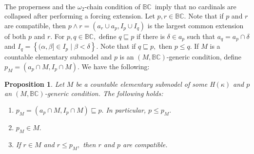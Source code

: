 \documentclass{article}
\newtheorem{proposition}[theorem]{Proposition}
\begin{document}
\qquad\qquad\ \ \ 

The properness and the $\omega_{2}$-chain condition of $\mathbb{BC}$\ imply
that no cardinals are collapsed after performing a forcing extension. Let
$p,r\in\mathbb{BC}.$ Note that if $p$ and $r$ are compatible, then $p\wedge
r=\left(  a_{r}\cup a_{p},I_{p}\cup I_{q}\right)  $ is the largest common
extension of both $p$ and $r.$ For $p,q\in\mathbb{BC},$ define $q\sqsubseteq
p$ if there is $\delta\in a_{p}$ such that $a_{q}=a_{p}\cap\delta$ and
$I_{q}=\left\{  (\alpha,\beta]\in I_{p}\mid\beta<\delta\right\}  .$ Note that
if $q\sqsubseteq p,$ then $p\leq q.$ If $M$ is a countable elementary submodel
and $p$ is an $(M,\mathbb{BC})$-generic condition, define $p_{M}=\left(
a_{p}\cap M,I_{p}\cap M\right)  .$ We have the following:

\begin{proposition}
Let $M$ be a countable elementary submodel of some \textsf{H}$\left(
\kappa\right)  $ and $p$ an $(M,\mathbb{BC})$-generic condition. The following
holds:\label{Prop BC Strongly proper}

\begin{enumerate}
\item $p_{M}=\left(  a_{p}\cap M,I_{p}\cap M\right)  \sqsubseteq p.$ In
particular, $p\leq p_{M}.$

\item $p_{M}\in M.$

\item If $r\in M$ and $r\leq p_{M},$ then $r$ and $p$ are compatible.
\end{enumerate}
\end{proposition}

\qquad\ \qquad\ 
\end{document}
